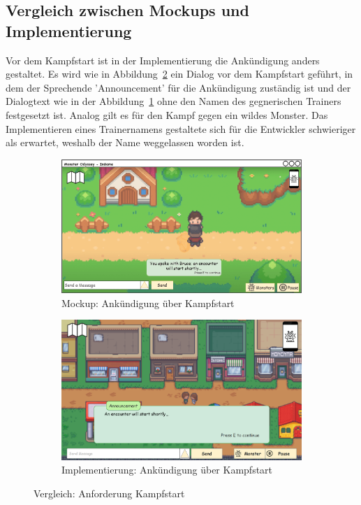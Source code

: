 \subsection{Vergleich zwischen Mockups und Implementierung}\label{subsec:vergleich-zwischen-mockups-und-implementierung-kampf-starten}
Vor dem Kampfstart ist in der Implementierung die Ankündigung anders gestaltet. Es wird wie in Abbildung~\ref{fig: Implementierung: Ankündigung über Kampfstart} ein Dialog vor dem Kampfstart geführt, in dem der Sprechende 'Announcement' für die Ankündigung zuständig ist und der Dialogtext wie in der Abbildung~\ref{fig: Mockup: Ankündigung über Kampfstart} ohne den Namen des gegnerischen Trainers festgesetzt ist. Analog gilt es für den Kampf gegen ein wildes Monster. Das Implementieren eines Trainernamens gestaltete sich für die Entwickler schwieriger als erwartet, weshalb der Name weggelassen worden ist.

\begin{figure}[H]
    \centering
    \begin{subfigure}[b]{0.4\textwidth}
        \includegraphics[width=\textwidth]{images/mockups/Ingame/PlayerAndPlayerFight.png}
        \caption{Mockup: Ankündigung über Kampfstart}
        \label{fig: Mockup: Ankündigung über Kampfstart}
    \end{subfigure}
    \hfill
    \begin{subfigure}[b]{0.4\textwidth}
        \includegraphics[width=\textwidth]{images/implementation/Ingame/Implementierung anncouncement.png}
        \caption{Implementierung: Ankündigung über Kampfstart}
        \label{fig: Implementierung: Ankündigung über Kampfstart}
    \end{subfigure}
    \caption{Vergleich: Anforderung Kampfstart}
    \label{fig: Vergleich: Anforderung Kampfstart}
\end{figure}